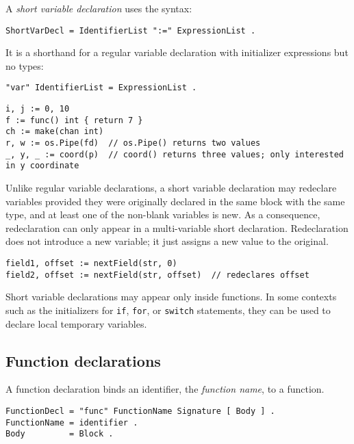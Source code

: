 A \emph{short variable declaration} uses the syntax:

\begin{Verbatim}[frame=single]
ShortVarDecl = IdentifierList ":=" ExpressionList .
\end{Verbatim}

It is a shorthand for a regular
variable declaration with initializer
expressions but no types:

\begin{Verbatim}[frame=single]
"var" IdentifierList = ExpressionList .
\end{Verbatim}

\begin{Verbatim}[frame=single]
i, j := 0, 10
f := func() int { return 7 }
ch := make(chan int)
r, w := os.Pipe(fd)  // os.Pipe() returns two values
_, y, _ := coord(p)  // coord() returns three values; only interested in y coordinate
\end{Verbatim}

Unlike regular variable declarations, a short variable declaration may
redeclare variables provided they were originally declared in the same
block with the same type, and at least one of the
non-blank variables is new. As a
consequence, redeclaration can only appear in a multi-variable short
declaration. Redeclaration does not introduce a new variable; it just
assigns a new value to the original.

\begin{Verbatim}[frame=single]
field1, offset := nextField(str, 0)
field2, offset := nextField(str, offset)  // redeclares offset
\end{Verbatim}

Short variable declarations may appear only inside functions. In some
contexts such as the initializers for \texttt{if}, \texttt{for}, or
\texttt{switch} statements, they can be used to declare local temporary
variables.

\subsection*{Function declarations}

A function declaration binds an identifier, the \emph{function name}, to
a function.

\begin{Verbatim}[frame=single]
FunctionDecl = "func" FunctionName Signature [ Body ] .
FunctionName = identifier .
Body         = Block .
\end{Verbatim}

